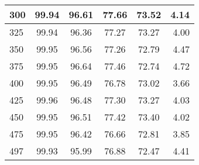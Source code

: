 \begin{tabular}{| l | c | c | c | c | r |}
	\hline
	300        &  99.94   & 96.61       &  77.66         &   73.52            &  4.14\\
	\hline
	325        &  99.94   & 96.36       &  77.27         &   73.27            &  4.00\\
	\hline
	350        &  99.95   & 96.56       &  77.26         &   72.79            &  4.47\\
	\hline
	375        &  99.95   & 96.64       &  77.46         &   72.74            &  4.72\\
	\hline
	400        &  99.95   & 96.49       &  76.78         &   73.02            &  3.66\\
	\hline
	425        &  99.96   & 96.48       &  77.30         &   73.27            &  4.03\\
	\hline
	450        &  99.95   & 96.51       &  77.42         &   73.40            &  4.02\\
	\hline
	475        &  99.95   & 96.42       &  76.66         &   72.81            &  3.85\\
	\hline
	497        &  99.93   & 95.99       &  76.88         &   72.47            &  4.41\\
	\hline
\end{tabular}

